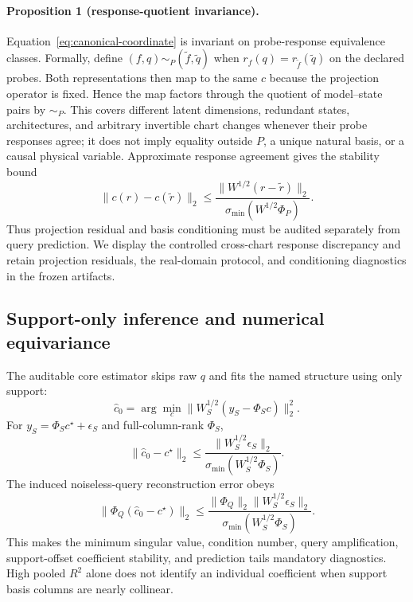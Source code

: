 \paragraph{Proposition 1 (response-quotient invariance).}
Equation~\eqref{eq:canonical-coordinate} is invariant on probe-response
equivalence classes.  Formally, define
$(f,q)\sim_P(\tilde f,\tilde q)$ when
$r_f(q)=r_{\tilde f}(\tilde q)$ on the declared probes.  Both representations
then map to the same $c$ because the projection operator is fixed.  Hence the
map factors through the quotient of model--state pairs by $\sim_P$.  This covers
different latent dimensions, redundant states, architectures, and arbitrary
invertible chart changes whenever their probe responses agree; it does not
imply equality outside $P$, a unique natural basis, or a causal physical
variable.  Approximate response agreement gives the stability bound
\begin{equation}
 \|c(r)-c(\tilde r)\|_2
 \leq
 \frac{\|W^{1/2}(r-\tilde r)\|_2}
 {\sigma_{\min}(W^{1/2}\Phi_P)}.
 \label{eq:projection-stability}
\end{equation}
Thus projection residual and basis conditioning must be audited separately from
query prediction.  We display the controlled cross-chart response discrepancy
and retain projection residuals, the real-domain protocol, and conditioning
diagnostics in the frozen artifacts.

\subsection{Support-only inference and numerical equivariance}

The auditable core estimator skips raw $q$ and fits the named structure using
only support:
\begin{equation}
  \hat c_{0}
  =\arg\min_c
  \|W_S^{1/2}(y_S-\Phi_Sc)\|_2^2.
  \label{eq:support-req}
\end{equation}
For $y_S=\Phi_Sc^\star+\epsilon_S$ and full-column-rank $\Phi_S$,
\begin{equation}
  \|\hat c_0-c^\star\|_2
  \leq
  \frac{\|W_S^{1/2}\epsilon_S\|_2}
  {\sigma_{\min}(W_S^{1/2}\Phi_S)}.
\end{equation}
The induced noiseless-query reconstruction error obeys
\begin{equation}
  \|\Phi_Q(\hat c_0-c^\star)\|_2
  \leq
  \frac{\|\Phi_Q\|_2\|W_S^{1/2}\epsilon_S\|_2}
  {\sigma_{\min}(W_S^{1/2}\Phi_S)}.
  \label{eq:query-amplification}
\end{equation}
This makes the minimum singular value,
condition number, query amplification, support-offset coefficient stability,
and prediction tails mandatory diagnostics.  High pooled $R^2$ alone does not
identify an individual coefficient when support basis columns are nearly
collinear.

